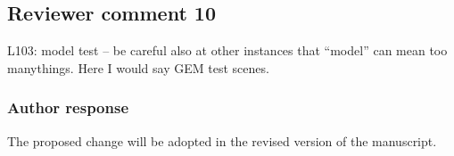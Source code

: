 \documentclass[11pt]{scrartcl}
\begin{document}
%
%
%
%
%
%
%
%
%
%
%
%
%


\subsection*{Reviewer comment 10}
L103: model test – be careful also at other instances that “model” can mean too manythings. Here I would say GEM test scenes.

\subsubsection*{Author response}

The proposed change will be adopted in the revised version of the manuscript.

%
\end{document}
